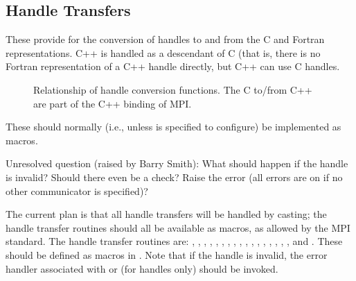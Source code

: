 \documentclass{article}
\begin{document}
\subsection{Handle Transfers}
\label{sec:handle-transfer}
These provide for the conversion of handles to and from the C and
Fortran representations.  C++ is handled as a descendant of C (that
is, there is no Fortran representation of a C++ handle directly, but
C++ can use C handles.  
\begin{figure}
\centerline{}
\caption{Relationship of handle conversion functions.  The C to/from
C++ are part of the C++ binding of MPI.}\label{fig:handle-transfers}
\end{figure}
These should normally (i.e., unless
 is
specified to configure) be implemented as macros.  

Unresolved question (raised by Barry Smith):  What should happen if
the handle is invalid?  Should there even be a check?  Raise the error
 (all errors are on  if
no other communicator is specified)?

The current plan is that all handle transfers will be handled by casting;
the handle transfer routines should all be available as macros, as allowed by
the MPI standard.  The handle transfer routines are:
,
,
,
,
,
,
,
,
,
,
,
,
,
,
,
,
, and
.
These should be defined as macros in .  Note that if the handle is
invalid, the error handler associated with  or
 (for  handles only) should be invoked.
\end{document}
